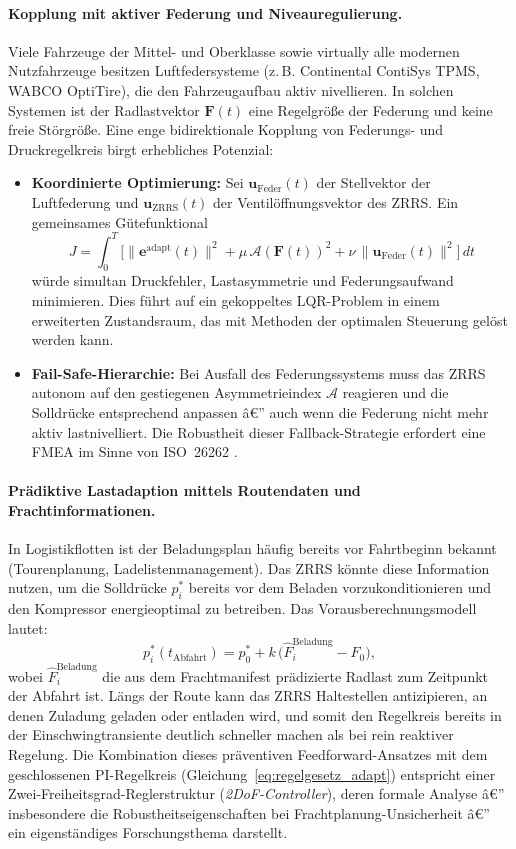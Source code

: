 ﻿\documentclass[a4paper,12pt]{article}
\theoremstyle{definition}
\begin{document}
\paragraph{Kopplung mit aktiver Federung und Niveauregulierung.}
Viele Fahrzeuge der Mittel- und Oberklasse sowie virtually alle modernen
Nutzfahrzeuge besitzen Luftfedersysteme (z.\,B. Continental ContiSys TPMS,
WABCO OptiTire), die den Fahrzeugaufbau aktiv nivellieren. In solchen
Systemen ist der Radlastvektor $\mathbf{F}(t)$ eine Regelgröße der
Federung und keine freie Störgröße. Eine enge bidirektionale
Kopplung von Federungs- und Druckregelkreis birgt erhebliches Potenzial:
\begin{itemize}
    \item \textbf{Koordinierte Optimierung:} Sei
    $\mathbf{u}_{\text{Feder}}(t)$ der Stellvektor der Luftfederung und
    $\mathbf{u}_{\text{ZRRS}}(t)$ der Ventilöffnungsvektor des ZRRS.
    Ein gemeinsames Gütefunktional
    \[
        J = \int_0^T \bigl[\|\mathbf{e}^{\text{adapt}}(t)\|^2
        + \mu\,\mathcal{A}(\mathbf{F}(t))^2
        + \nu\,\|\mathbf{u}_{\text{Feder}}(t)\|^2\bigr]\,dt
    \]
    würde simultan Druckfehler, Lastasymmetrie und Federungsaufwand
    minimieren. Dies führt auf ein gekoppeltes LQR-Problem in einem
    erweiterten Zustandsraum, das mit Methoden der optimalen
    Steuerung \cite{astroem} gelöst werden kann.
    \item \textbf{Fail-Safe-Hierarchie:} Bei Ausfall des Federungssystems
    muss das ZRRS autonom auf den gestiegenen Asymmetrieindex $\mathcal{A}$
    reagieren und die Solldrücke entsprechend anpassen â€” auch wenn die
    Federung nicht mehr aktiv lastnivelliert. Die Robustheit dieser
    Fallback-Strategie erfordert eine FMEA im Sinne von ISO~26262 \cite{iso26262}.
\end{itemize}

\paragraph{Prädiktive Lastadaption mittels Routendaten und Frachtinformationen.}
In Logistikflotten ist der Beladungsplan häufig bereits vor Fahrtbeginn
bekannt (Tourenplanung, Ladelistenmanagement). Das ZRRS könnte diese
Information nutzen, um die Solldrücke $p^*_i$ bereits vor dem Beladen
vorzukonditionieren und den Kompressor energieoptimal zu betreiben.
Das Vorausberechnungsmodell lautet:
\[
    p^*_i(t_{\text{Abfahrt}}) = p^*_0 + k\,\bigl(\hat{F}_i^{\text{Beladung}} - F_0\bigr),
\]
wobei $\hat{F}_i^{\text{Beladung}}$ die aus dem Frachtmanifest prädizierte
Radlast zum Zeitpunkt der Abfahrt ist. Längs der Route kann das ZRRS
Haltestellen antizipieren, an denen Zuladung geladen oder entladen wird,
und somit den Regelkreis bereits in der Einschwingtransiente deutlich
schneller machen als bei rein reaktiver Regelung. Die Kombination dieses
präventiven Feedforward-Ansatzes mit dem geschlossenen PI-Regelkreis
(Gleichung~\eqref{eq:regelgesetz_adapt}) entspricht einer
Zwei-Freiheitsgrad-Reglerstruktur (\emph{2DoF-Controller}), deren
formale Analyse â€” insbesondere die Robustheitseigenschaften bei
Frachtplanung-Unsicherheit â€” ein eigenständiges Forschungsthema darstellt.
\end{document}
